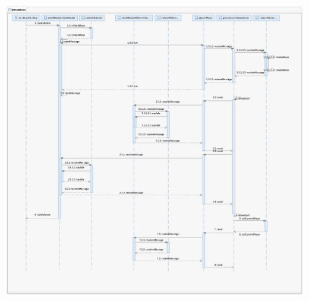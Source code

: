 \documentclass{article}
\begin{document}
\includegraphics[width=\textwidth]{Entwurf_PlayCard}
		
\end{document}
